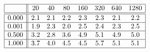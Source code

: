 \[
\begin{array}{|c||ccccccc|}
\hline 
& 20 & 40 & 80 & 160 & 320 & 640 & 1280\\
\hline \hline 
0.000 & 2.1 & 2.1 & 2.2 & 2.3 & 2.3 & 2.1 & 2.2 \\ \hline 
0.001 & 1.9 & 2.3 & 2.0 & 2.5 & 2.4 & 2.3 & 2.5 \\ \hline 
0.500 & 3.2 & 2.8 & 3.6 & 4.9 & 5.1 & 4.9 & 5.0 \\ \hline 
1.000 & 3.7 & 4.0 & 4.5 & 4.5 & 5.7 & 5.1 & 5.1 \\ \hline 
\end{array}
\]

